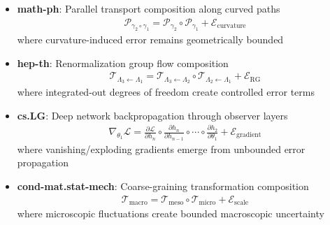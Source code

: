 \begin{theorem}
\begin{itemize}
\item \textbf{math-ph}: Parallel transport composition along curved paths
  \begin{align}
  \mathcal{P}_{\gamma_2 \circ \gamma_1} = \mathcal{P}_{\gamma_2} \circ \mathcal{P}_{\gamma_1} + \mathcal{E}_{\text{curvature}}
  \end{align}
  where curvature-induced error remains geometrically bounded
  
\item \textbf{hep-th}: Renormalization group flow composition
  \begin{align}
  \mathcal{T}_{\Lambda_3 \leftarrow \Lambda_1} = \mathcal{T}_{\Lambda_3 \leftarrow \Lambda_2} \circ \mathcal{T}_{\Lambda_2 \leftarrow \Lambda_1} + \mathcal{E}_{\text{RG}}
  \end{align}
  where integrated-out degrees of freedom create controlled error terms
  
\item \textbf{cs.LG}: Deep network backpropagation through observer layers
  \begin{align}
  \nabla_{\theta_1} \mathcal{L} = \frac{\partial \mathcal{L}}{\partial h_n} \circ \frac{\partial h_n}{\partial h_{n-1}} \circ \cdots \circ \frac{\partial h_2}{\partial \theta_1} + \mathcal{E}_{\text{gradient}}
  \end{align}
  where vanishing/exploding gradients emerge from unbounded error propagation
  
\item \textbf{cond-mat.stat-mech}: Coarse-graining transformation composition
  \begin{align}
  \mathcal{T}_{\text{macro}} = \mathcal{T}_{\text{meso}} \circ \mathcal{T}_{\text{micro}} + \mathcal{E}_{\text{scale}}
  \end{align}
  where microscopic fluctuations create bounded macroscopic uncertainty
\end{itemize}
\end{theorem}

